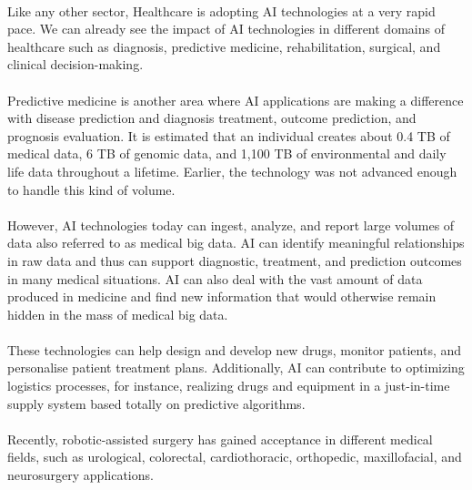 \documentclass[12pt]{article}
\begin{document}
\paragraph{}
Like any other sector, Healthcare is adopting AI technologies at a very rapid pace. We can already see the impact of AI technologies in different domains of healthcare such as diagnosis, predictive medicine, rehabilitation, surgical, and clinical decision-making. 

\paragraph{}
Predictive medicine is another area where AI applications are making a difference with disease prediction and diagnosis treatment, outcome prediction, and prognosis evaluation. It is estimated that an individual creates about 0.4 TB of medical data, 6 TB of genomic data, and 1,100 TB of environmental and daily life data throughout a lifetime. Earlier, the technology was not advanced enough to handle this kind of volume. \cite{Jeong Hyeon Han}

\paragraph{}
However, AI technologies today can ingest, analyze, and report large volumes of data also referred to as medical big data. AI can identify meaningful relationships in raw data and thus can support diagnostic, treatment, and prediction outcomes in many medical situations. AI can also deal with the vast amount of data produced in medicine and find new information that would otherwise remain hidden in the mass of medical big data. \cite{Silvana Secinaro}

\paragraph{}
These technologies can help design and develop new drugs, monitor patients, and personalise patient treatment plans. Additionally, AI can contribute to optimizing logistics processes, for instance, realizing drugs and equipment in a just-in-time supply system based totally on predictive algorithms.


\paragraph{}
Recently, robotic-assisted surgery has gained acceptance in different medical fields, such as urological, colorectal, cardiothoracic, orthopedic, maxillofacial, and neurosurgery applications.\cite{Silvana Secinaro}
\end{document}
